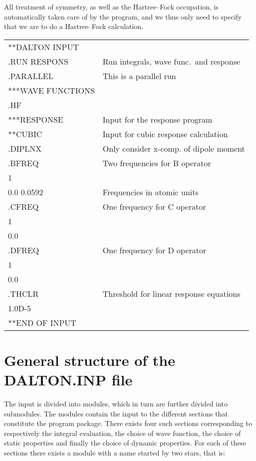 All treatment  of symmetry, as well as the Hartree--Fock
occupation, is
automatically taken care of by the program, and we thus only need to
specify that we are to do a Hartree--Fock calculation.

{\ttfamily
\begin{tabular}{ll}
**DALTON INPUT\\
.RUN RESPONS\hspace{2.5cm} & Run integrals, wave func.\ and
response\\
.PARALLEL & This is a parallel run\\
***WAVE FUNCTIONS\\
.HF\\
***RESPONSE & Input for the response program\\
**CUBIC & Input for cubic response calculation\\
.DIPLNX & Only consider x-comp. of dipole moment\\
.BFREQ & Two frequencies for B operator\\
 1\\
 0.0 0.0592& Frequencies in atomic units\\
.CFREQ & One frequency for C operator\\
 1\\
 0.0\\
.DFREQ & One frequency for D operator\\
 1\\
 0.0\\
.THCLR & Threshold for linear response equations\\
 1.0D-5\\
**END OF INPUT\\
\end{tabular}}

\section{General structure of the DALTON.INP file}\label{sec:inputstructure}

The input is divided into modules, which in turn are
further divided into submodules. The modules contain
the input to the different
sections that constitute the {\dalton} program package. There exists
four such sections corresponding to respectively the integral
evaluation, the choice of wave function, the
choice of static properties and finally
the choice of dynamic properties. For each of
these sections there exists a module with a name started by two stars,
that is:

